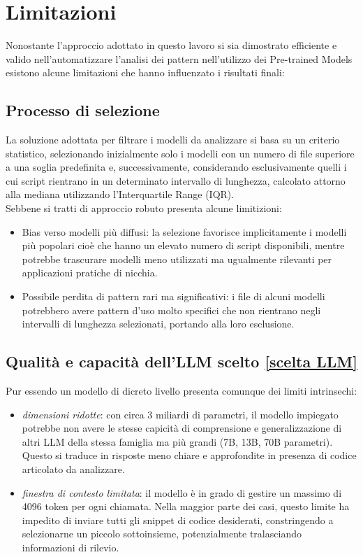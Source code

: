 \documentclass{article}
\begin{document}
\section{Limitazioni}
Nonostante l'approccio adottato in questo lavoro si sia dimostrato efficiente e valido nell'automatizzare l'analisi dei pattern nell'utilizzo dei Pre-trained Models esistono alcune limitazioni che hanno influenzato i risultati finali:

\subsection{Processo di selezione}
La soluzione adottata per filtrare i modelli da analizzare si basa su un criterio statistico, selezionando inizialmente solo i modelli con un numero di file superiore a una soglia predefinita e, successivamente, considerando esclusivamente quelli i cui script rientrano in un determinato intervallo di lunghezza, calcolato attorno alla mediana utilizzando l’Interquartile Range (IQR).\\
Sebbene si tratti di approccio robuto presenta alcune limitizioni:
\begin{itemize}
    \item Bias verso modelli più diffusi: la selezione favorisce implicitamente i modelli più popolari cioè che hanno un elevato numero di script disponibili, mentre potrebbe trascurare modelli meno utilizzati ma ugualmente rilevanti per applicazioni pratiche di nicchia. 
    \item Possibile perdita di pattern rari ma significativi: i file di alcuni modelli potrebbero avere pattern d’uso molto specifici che non rientrano negli intervalli di lunghezza selezionati, portando alla loro esclusione.
\end{itemize}

\subsection{Qualità e capacità dell'LLM scelto \ref{scelta LLM}}
Pur essendo un modello di dicreto livello presenta comunque dei limiti intrinsechi:
\begin{itemize}
    \item \textit{dimensioni ridotte}: con circa 3 miliardi di parametri, il modello impiegato potrebbe non avere le stesse capicità di comprensione e generalizzazione di altri LLM della stessa famiglia ma più grandi (7B, 13B, 70B parametri). Questo si traduce in risposte meno chiare e approfondite in presenza di codice articolato da analizzare.
    \item \textit{finestra di contesto limitata}: il modello è in grado di gestire un massimo di 4096 token per ogni chiamata. Nella maggior parte dei casi, questo limite ha impedito di inviare tutti gli snippet di codice desiderati, constringendo a selezionarne un piccolo sottoinsieme, potenzialmente tralasciando informazioni di rilevio.
\end{itemize}
\end{document}
